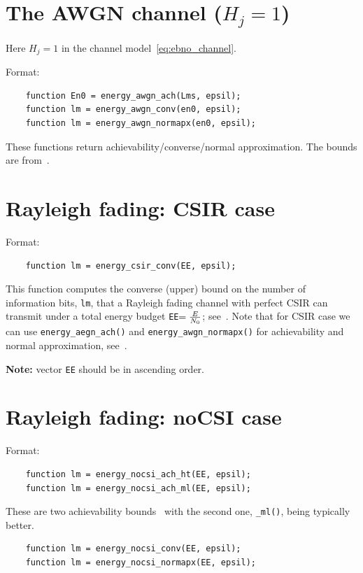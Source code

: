 \documentclass[a4paper,11p]{memoir}
\begin{document}
\section{The AWGN channel ($H_j=1$)}

Here $H_j=1$ in the channel model~\eqref{eq:ebno_channel}.

Format:
\begin{verbatim}
	function En0 = energy_awgn_ach(Lms, epsil);
	function lm = energy_awgn_conv(en0, epsil);
	function lm = energy_awgn_normapx(en0, epsil);
\end{verbatim}

These functions return achievability/converse/normal approximation. The bounds are from~\cite[Theorems 2 and 3]{PPV10eneff}.

\section{Rayleigh fading: CSIR case}

Format:
\begin{verbatim}
	function lm = energy_csir_conv(EE, epsil);
\end{verbatim}

This function computes the converse (upper) bound on the number of information bits, \verb|lm|, that a Rayleigh fading
channel with perfect CSIR can transmit under a total energy budget \verb|EE|$={E\over N_0}$; see~\cite[Theorem
11]{YDP15}. Note that for CSIR case we can use \verb|energy_aegn_ach()| and \verb|energy_awgn_normapx()| for
achievability and normal approximation, see~\cite[Section III.D]{YDP15}.

\medskip
\textbf{Note:} vector \verb|EE| should be in ascending order.

\section{Rayleigh fading: noCSI case}

Format:
\begin{verbatim}
	function lm = energy_nocsi_ach_ht(EE, epsil);
	function lm = energy_nocsi_ach_ml(EE, epsil);
\end{verbatim}

	These are two achievability bounds~\cite[Corollary 4 and 5]{YDP15} with the second one, \verb|_ml()|, being
	typically better.

\begin{verbatim}
	function lm = energy_nocsi_conv(EE, epsil);
	function lm = energy_nocsi_normapx(EE, epsil);
\end{verbatim}
\end{document}
